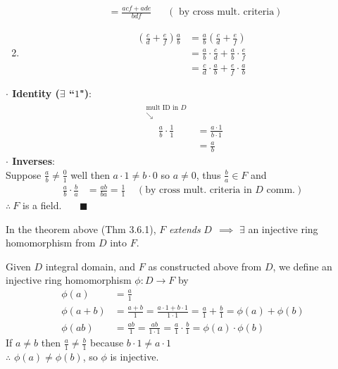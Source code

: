 \begin{theorem}
\begin{enumerate}
\begin{align}
            &= \frac{acf+ade}{bdf} \ \ \ \ \ \ \ (\text{ by cross mult. criteria}) \nonumber
        \end{align}
        \item 
        \begin{align}
            \left( \frac{c}{d}+\frac{e}{f} \right)\frac{a}{b} &= \frac{a}{b}\left(\frac{c}{d}+\frac{e}{f}\right) \nonumber \\
            &= \frac{a}{b}\cdot \frac{c}{d} + \frac{a}{b}\cdot \frac{e}{f} \nonumber \\
            &= \frac{c}{d}\cdot \frac{a}{b} + \frac{e}{f} \cdot \frac{a}{b} \nonumber 
        \end{align}
    \end{enumerate}
    \noindent \textbf{$\cdot$ Identity ($\exists$ ``$1$")}: \\
    \begin{align}
        \overset{\substack{\text{mult ID in }D \\ \searrow \\}}{\frac{a}{b}\cdot \frac{1}{1}} &= \frac{a\cdot 1}{b \cdot 1} \nonumber \\
        &= \frac{a}{b} \nonumber
    \end{align}
    \noindent \textbf{$\cdot$ Inverses}: \\
    Suppose $\frac{a}{b}\neq \frac{0}{1}$ well then $a\cdot 1 \neq b\cdot 0$ so $a\neq 0$, thus $\frac{b}{a}\in F$ and 
    \begin{align}
        \frac{a}{b}\cdot \frac{b}{a} &= \frac{ab}{ba} = \frac{1}{1} \ \ \ \ \ (\text{by cross mult. criteria in }D \text{ comm.}) \nonumber
    \end{align}
    $\therefore  \ F$ is a field. \ \ \  $\blacksquare$
\end{theorem}

In the theorem above (Thm 3.6.1), $F$ \textit{extends} $D \ \ \implies$ $\exists$ an injective ring homomorphism from $D$ into $F$. \\
\begin{definition}
    \label{defn:embeddingofD}
    Given $D$ integral domain, and $F$ as constructed above from $D$, we define an injective ring homomorphism $\phi: D \rightarrow F$ by
    \begin{align}
        \phi(a) &= \frac{a}{1} \nonumber \\ 
        \phi(a+b) &= \frac{a+b}{1} = \frac{a\cdot 1+b\cdot 1}{1\cdot 1} = \frac{a}{1}+\frac{b}{1} = \phi(a)+\phi(b) \nonumber \\
        \phi(ab) &= \frac{ab}{1} = \frac{ab}{1\cdot 1} = \frac{a}{1}\cdot \frac{b}{1} = \phi(a)\cdot \phi(b) \nonumber 
    \end{align}
    If $a\neq b$ then $\frac{a}{1} \neq \frac{b}{1}$ because $b\cdot 1 \neq a \cdot 1$ \\
    $\therefore$ $\phi(a)\neq \phi(b)$, so $\phi$ is injective.
\end{definition}

